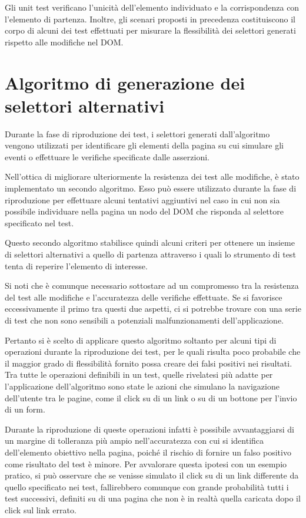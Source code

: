 Gli unit test verificano l'unicità dell'elemento individuato e la corrispondenza con l'elemento di partenza. Inoltre, gli scenari proposti in precedenza costituiscono il corpo di alcuni dei test effettuati per misurare la flessibilità dei selettori generati rispetto alle modifiche nel DOM.

\section{Algoritmo di generazione dei selettori alternativi}

Durante la fase di riproduzione dei test, i selettori generati dall'algoritmo vengono utilizzati per identificare gli elementi della pagina su cui simulare gli eventi o effettuare le verifiche specificate dalle asserzioni.

Nell'ottica di migliorare ulteriormente la resistenza dei test alle modifiche, è stato implementato un secondo algoritmo. Esso può essere utilizzato durante la fase di riproduzione per effettuare alcuni tentativi aggiuntivi nel caso in cui non sia possibile individuare nella pagina un nodo del DOM che risponda al selettore specificato nel test.

Questo secondo algoritmo stabilisce quindi alcuni criteri per ottenere un insieme di selettori alternativi a quello di partenza attraverso i quali lo strumento di test tenta di reperire l'elemento di interesse. 

Si noti che è comunque necessario sottostare ad un compromesso tra la resistenza del test alle modifiche e l'accuratezza delle verifiche effettuate. Se si favorisce eccessivamente il primo tra questi due aspetti, ci si potrebbe trovare con una serie di test che non sono sensibili a potenziali malfunzionamenti dell'applicazione.

Pertanto si è scelto di applicare questo algoritmo soltanto per alcuni tipi di operazioni durante la riproduzione dei test, per le quali risulta poco probabile che il maggior grado di flessibilità fornito possa creare dei falsi positivi nei risultati. Tra tutte le operazioni definibili in un test, quelle rivelatesi più adatte per l'applicazione dell'algoritmo sono state le azioni che simulano la navigazione dell'utente tra le pagine, come il click su di un link o su di un bottone per l'invio di un form.

Durante la riproduzione di queste operazioni infatti è possibile avvantaggiarsi di un margine di tolleranza più ampio nell'accuratezza con cui si identifica dell'elemento obiettivo nella pagina, poiché il rischio di fornire un falso positivo come risultato del test è minore. Per avvalorare questa ipotesi con un esempio pratico, si può osservare che se venisse simulato il click su di un link differente da quello specificato nei test, fallirebbero comunque con grande probabilità tutti i test successivi, definiti su di una pagina che non è in realtà quella caricata dopo il click sul link errato.


